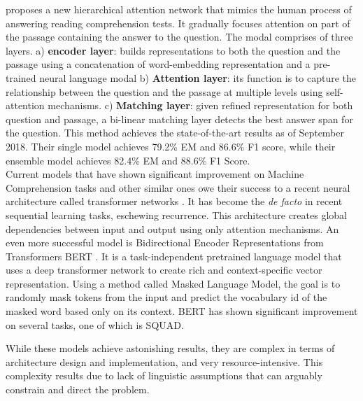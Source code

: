 \cite{DBLP:journals/corr/abs-1811-11934} proposes a new hierarchical attention network that mimics the human process of answering reading comprehension tests. It gradually focuses attention on part of the passage containing the answer to the question. The modal comprises of three layers. a) \textbf{encoder layer}: builds representations to both the question and the passage using a concatenation of word-embedding representation \cite{pennington2014glove} and a pre-trained neural language modal \cite{Peters:2018} b) \textbf{Attention layer}: its function is to capture the relationship between the question and the passage at multiple levels using self-attention mechanisms. c) \textbf{Matching layer}: given refined representation for both question and passage, a bi-linear matching layer detects the best answer span for the question. This method achieves the state-of-the-art results as of September 2018. Their single model achieves 79.2\% EM and 86.6\% F1 score, while their ensemble model achieves 82.4\% EM and 88.6\% F1 Score. \\

Current models that have shown significant improvement on Machine Comprehension tasks and other similar ones owe their success to a recent neural architecture called transformer networks \citep{DBLP:journals/corr/VaswaniSPUJGKP17}. It has become the \emph{de facto} in recent sequential learning tasks, eschewing recurrence. This architecture creates global dependencies between input and output using only attention mechanisms. An even more successful model is Bidirectional Encoder Representations from Transformers BERT \cite{DBLP:journals/corr/abs-1810-04805}. It is a task-independent pretrained language model that uses a deep transformer network to create rich and context-specific vector representation. Using a method called Masked Language Model, the goal is to randomly mask tokens from the input and predict the vocabulary id of the masked word based only on its context. BERT has shown significant improvement on several tasks, one of which is SQUAD. 


While these models achieve astonishing results, they are  complex in terms of architecture design and implementation, and very resource-intensive. This complexity results due to  lack of linguistic assumptions that can arguably constrain and direct the problem. 


